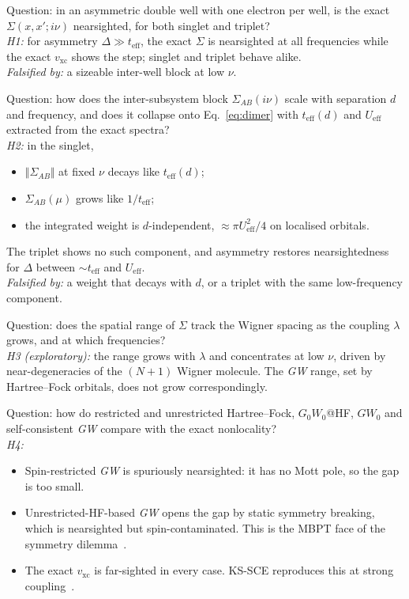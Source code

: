 \documentclass[11pt,a4paper]{article}
\newcommand{\GW}{\textit{GW}}
\newcommand{\vxc}{v_\mathrm{xc}}
\newcommand{\teff}{t_\mathrm{eff}}
\newcommand{\Ueff}{U_\mathrm{eff}}
\begin{document}
\begin{description}[style=nextline,leftmargin=1em,labelindent=0pt,itemsep=6pt]
\item[RQ1 (exact $\Sigma$ in the 2019 setting).] Question: in an asymmetric double well with one electron per well, is the exact $\Sigma(x,x';i\nu)$ nearsighted, for both singlet and triplet?\\
\textit{H1:} for asymmetry $\Delta\gg\teff$, the exact $\Sigma$ is nearsighted at all frequencies while the exact $\vxc$ shows the step; singlet and triplet behave alike.\\
\textit{Falsified by:} a sizeable inter-well block at low $\nu$.

\item[RQ2 (symmetric dissociation; central).] Question: how does the inter-subsystem block $\Sigma_{AB}(i\nu)$ scale with separation $d$ and frequency, and does it collapse onto Eq.~\eqref{eq:dimer} with $\teff(d)$ and $\Ueff$ extracted from the exact spectra?\\
\textit{H2:} in the singlet,
\begin{itemize}
\item $\Vert\Sigma_{AB}\Vert$ at fixed $\nu$ decays like $\teff(d)$;
\item $\Sigma_{AB}(\mu)$ grows like $1/\teff$;
\item the integrated weight is $d$-independent, $\approx\pi\Ueff^2/4$ on localised orbitals.
\end{itemize}
The triplet shows no such component, and asymmetry restores nearsightedness for $\Delta$ between $\sim\teff$ and $\Ueff$.\\
\textit{Falsified by:} a weight that decays with $d$, or a triplet with the same low-frequency component.

\item[RQ3 (Wigner molecule in a single soft well).] Question: does the spatial range of $\Sigma$ track the Wigner spacing as the coupling $\lambda$ grows, and at which frequencies?\\
\textit{H3 (exploratory):} the range grows with $\lambda$ and concentrates at low $\nu$, driven by near-degeneracies of the $(N+1)$ Wigner molecule. The \GW{} range, set by Hartree--Fock orbitals, does not grow correspondingly.

\item[RQ4 (approximations).] Question: how do restricted and unrestricted Hartree--Fock, $G_0W_0$@HF, $GW_0$ and self-consistent \GW{} compare with the exact nonlocality?\\
\textit{H4:}
\begin{itemize}
\item Spin-restricted \GW{} is spuriously nearsighted: it has no Mott pole, so the gap is too small.
\item Unrestricted-HF-based \GW{} opens the gap by static symmetry breaking, which is nearsighted but spin-contaminated. This is the MBPT face of the symmetry dilemma~\cite{perdew1995}.
\item The exact $\vxc$ is far-sighted in every case. KS-SCE reproduces this at strong coupling~\cite{mirtschink2013,giarrusso2024}.
\end{itemize}


\end{description}
\end{document}
